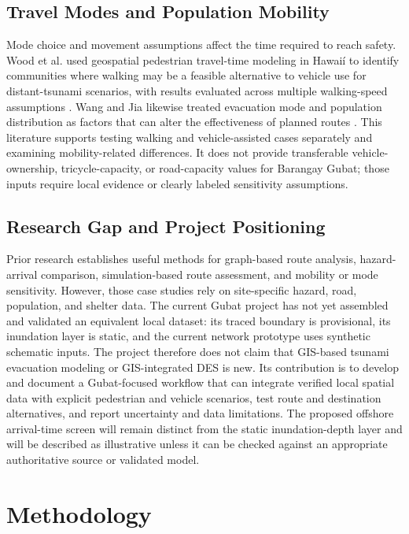 \documentclass[conference]{IEEEtran}
\begin{document}
\subsection{Travel Modes and Population Mobility}

Mode choice and movement assumptions affect the time required to reach safety. Wood et al. used geospatial pedestrian travel-time modeling in Hawai\'i to identify communities where walking may be a feasible alternative to vehicle use for distant-tsunami scenarios, with results evaluated across multiple walking-speed assumptions \cite{wood}. Wang and Jia likewise treated evacuation mode and population distribution as factors that can alter the effectiveness of planned routes \cite{wangjia}. This literature supports testing walking and vehicle-assisted cases separately and examining mobility-related differences. It does not provide transferable vehicle-ownership, tricycle-capacity, or road-capacity values for Barangay Gubat; those inputs require local evidence or clearly labeled sensitivity assumptions.

\subsection{Research Gap and Project Positioning}

Prior research establishes useful methods for graph-based route analysis, hazard-arrival comparison, simulation-based route assessment, and mobility or mode sensitivity. However, those case studies rely on site-specific hazard, road, population, and shelter data. The current Gubat project has not yet assembled and validated an equivalent local dataset: its traced boundary is provisional, its inundation layer is static, and the current network prototype uses synthetic schematic inputs. The project therefore does not claim that GIS-based tsunami evacuation modeling or GIS-integrated DES is new. Its contribution is to develop and document a Gubat-focused workflow that can integrate verified local spatial data with explicit pedestrian and vehicle scenarios, test route and destination alternatives, and report uncertainty and data limitations. The proposed offshore arrival-time screen will remain distinct from the static inundation-depth layer and will be described as illustrative unless it can be checked against an appropriate authoritative source or validated model.

\section{Methodology}
\end{document}
